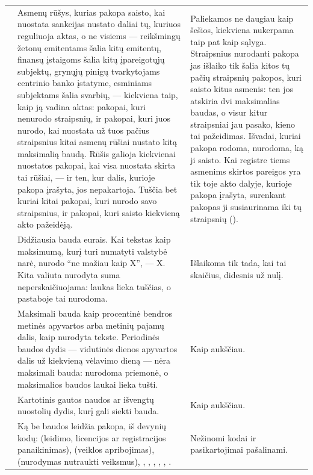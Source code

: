 \begin{xltabular}{\textwidth}{@{}L{27mm}YY@{}}
 & Asmenų rūšys, kurias pakopa saisto, kai nuostata sankcijas nustato daliai tų, kuriuos reguliuoja aktas, o ne visiems --- reikšmingų žetonų emitentams šalia kitų emitentų, finansų įstaigoms šalia kitų įpareigotųjų subjektų, grynųjų pinigų tvarkytojams centrinio banko įstatyme, esminiams subjektams šalia svarbių, --- kiekviena taip, kaip ją vadina aktas: pakopai, kuri nenurodo straipsnių, ir pakopai, kuri juos nurodo, kai nuostata už tuos pačius straipsnius kitai asmenų rūšiai nustato kitą maksimalią baudą. Rūšis galioja kiekvienai nuostatos pakopai, kai visa nuostata skirta tai rūšiai, --- ir ten, kur dalis, kurioje pakopa įrašyta, jos nepakartoja. Tuščia bet kuriai kitai pakopai, kuri nurodo savo straipsnius, ir pakopai, kuri saisto kiekvieną akto pažeidėją. & Paliekamos ne daugiau kaip šešios, kiekviena nukerpama taip pat kaip sąlyga. Straipsnius nurodanti pakopa jas išlaiko tik šalia kitos tų pačių straipsnių pakopos, kuri saisto kitus asmenis: ten jos atskiria dvi maksimalias baudas, o visur kitur straipsniai jau pasako, kieno tai pažeidimas. Išvadai, kuriai pakopa rodoma, nurodoma, ką ji saisto. Kai registre tiems asmenims skirtos pareigos yra tik toje akto dalyje, kurioje pakopa įrašyta, surenkant pakopas ji susiaurinama iki tų straipsnių (). \\
 & Didžiausia bauda eurais. Kai tekstas kaip maksimumą, kurį turi numatyti valstybė narė, nurodo \enquote{ne mažiau kaip X}, --- X. Kita valiuta nurodyta suma neperskaičiuojama: laukas lieka tuščias, o pastaboje tai nurodoma. & Išlaikoma tik tada, kai tai skaičius, didesnis už nulį. \\
 & Maksimali bauda kaip procentinė bendros metinės apyvartos arba metinių pajamų dalis, kaip nurodyta tekste. Periodinės baudos dydis --- vidutinės dienos apyvartos dalis už kiekvieną vėlavimo dieną --- nėra maksimali bauda: nurodoma priemonė, o maksimalios baudos laukai lieka tušti. & Kaip aukščiau. \\
 & Kartotinis gautos naudos ar išvengtų nuostolių dydis, kurį gali siekti bauda. & Kaip aukščiau. \\
 & Ką be baudos leidžia pakopa, iš devynių kodų:  (leidimo, licencijos ar registracijos panaikinimas),  (veiklos apribojimas),  (nurodymas nutraukti veiksmus), , , , , , . & Nežinomi kodai ir pasikartojimai pašalinami. \\
\end{xltabular}

